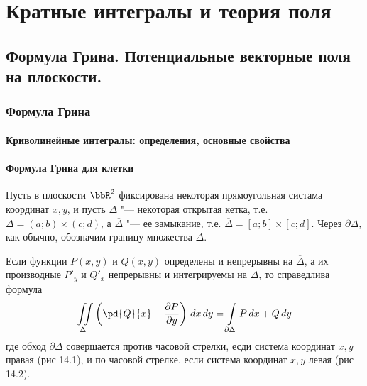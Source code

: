 \part[Кратные интегралы и теория поля]{Кратные интегралы и теория поля}%

\chapter{Формула Грина. Потенциальные векторные поля на плоскости.}
\section{Формула Грина} 

\subsection{Криволинейные интегралы: определения, основные свойства}

\subsection{Формула Грина для клетки}

Пусть в плоскости $\bbR^2$ фиксирована некоторая прямоугольная систама координат $x,y$, и пусть $\Delta$ "--- некоторая открытая кетка, т.е. $\Delta = (a;b)\times(c;d)$, а $\overline{\Delta}$ "--- ее замыкание, т.е. $\overline{\Delta}=[a;b]\times[c;d]$. Через $\partial \Delta$, как обычно, обозначим границу множества $\Delta$.


\begin{lemm}
Если функции $P(x,y)$ и $Q(x,y)$ определены и непрерывны на $\overline{\Delta}$, а их производные $P'_y$ и $Q'_x$ непрерывны и интегрируемы на $\Delta$, то справедлива формула
\begin{equation} \label{Grin}
\iint\limits_{\Delta} \left( \pd{Q}{x}-\frac{\partial P}{\partial y} \right)\,dx\,dy = \int\limits_{\partial \Delta} P\,dx + Q\,dy
\end{equation}
где обход $\partial\Delta$ совершается против часовой стрелки, есди система координат $x,y$ правая (рис 14.1), и по часовой стрелке, если система координат $x,y$ левая (рис 14.2).
\end{lemm}

